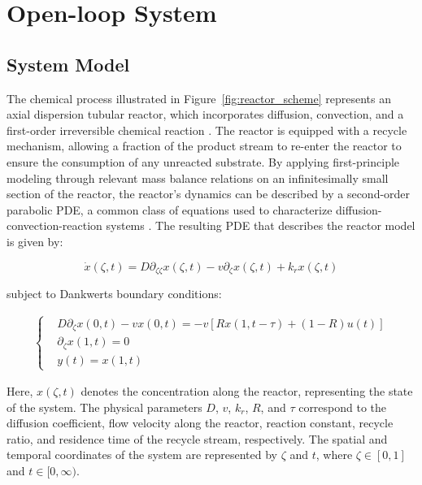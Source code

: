 \newpage
\section{Open-loop System}

\subsection{System Model}

The chemical process illustrated in Figure~\ref{fig:reactor_scheme} represents an axial dispersion tubular reactor, which incorporates diffusion, convection, and a first-order irreversible chemical reaction \autocite{levenspiel1998chemical}. The reactor is equipped with a recycle mechanism, allowing a fraction of the product stream to re-enter the reactor to ensure the consumption of any unreacted substrate. By applying first-principle modeling through relevant mass balance relations on an infinitesimally small section of the reactor, the reactor's dynamics can be described by a second-order parabolic PDE, a common class of equations used to characterize diffusion-convection-reaction systems \autocite{jensen1982bifurcation}. The resulting PDE that describes the reactor model is given by:

\begin{equation} \label{eq:PDE_original_model}
    \dot{x}(\zeta, t) = D \partial_{\zeta \zeta} x(\zeta, t) - v \partial_\zeta x(\zeta, t) + k_r x(\zeta, t)
\end{equation}

subject to Dankwerts boundary conditions:

\begin{align} \label{eq:BC}
    \begin{cases}
        &D \partial_\zeta x(0, t) - v x(0, t) = -v \left[ R x(1, t-\tau) + (1-R) u(t) \right] \\
        &\partial_\zeta x(1, t) = 0 \\
        &y(t) = x(1, t)
    \end{cases}
\end{align}

Here, \(x(\zeta, t)\) denotes the concentration along the reactor, representing the state of the system. The physical parameters \(D\), \(v\), \(k_r\), \(R\), and \(\tau\) correspond to the diffusion coefficient, flow velocity along the reactor, reaction constant, recycle ratio, and residence time of the recycle stream, respectively. The spatial and temporal coordinates of the system are represented by \(\zeta\) and \(t\), where \(\zeta \in [0, 1]\) and \(t \in [0, \infty)\).

